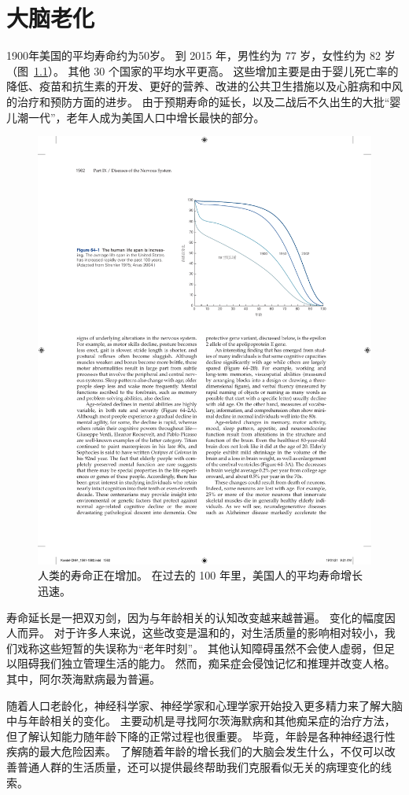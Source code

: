 \chapter{大脑老化} \label{chap:chap64}

1900年美国的平均寿命约为50岁。
到 2015 年，男性约为 77 岁，女性约为 82 岁（图~\ref{fig:64_1}）。
其他 30 个国家的平均水平更高。
这些增加主要是由于婴儿死亡率的降低、疫苗和抗生素的开发、更好的营养、改进的公共卫生措施以及心脏病和中风的治疗和预防方面的进步。
由于预期寿命的延长，以及二战后不久出生的大批“婴儿潮一代”，老年人成为美国人口中增长最快的部分。


\begin{figure}[htbp]
	\centering
	\includegraphics[width=0.78\linewidth]{chap64/fig_64_1}
	\caption{人类的寿命正在增加。
		在过去的 100 年里，美国人的平均寿命增长迅速\cite{strehler1975implications,arias2007united}。}
	\label{fig:64_1}
\end{figure}


寿命延长是一把双刃剑，因为与年龄相关的认知改变越来越普遍。
变化的幅度因人而异。
对于许多人来说，这些改变是温和的，对生活质量的影响相对较小，我们戏称这些短暂的失误称为“老年时刻”。
其他认知障碍虽然不会使人虚弱，但足以阻碍我们独立管理生活的能力。
然而，痴呆症会侵蚀记忆和推理并改变人格。
其中，阿尔茨海默病最为普遍。


随着人口老龄化，神经科学家、神经学家和心理学家开始投入更多精力来了解大脑中与年龄相关的变化。
主要动机是寻找阿尔茨海默病和其他痴呆症的治疗方法，但了解认知能力随年龄下降的正常过程也很重要。
毕竟，年龄是各种神经退行性疾病的最大危险因素。
了解随着年龄的增长我们的大脑会发生什么，不仅可以改善普通人群的生活质量，还可以提供最终帮助我们克服看似无关的病理变化的线索。


